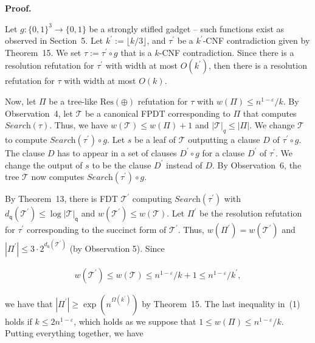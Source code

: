 \documentclass[10pt,a4paper]{article}
\begin{document}
\par\medskip\noindent\textbf{Proof.}\par




Let $g:\{0,1\}^{3}\to\{0,1\}$ be a strongly stifled gadget – such functions exist as observed in Section 5.
Let $k^{\prime}:=\lfloor k/3\rfloor$, and $\tau^{\prime}$ be a $k^{\prime}$-CNF contradiction given by Theorem 15.
We set $\tau:=\tau^{\prime}\circ g$ that is a $k$-CNF contradiction.
Since there is a resolution refutation for $\tau^{\prime}$ with width at most $O(k^{\prime})$, then there is a resolution refutation for $\tau$ with width at most $O(k)$.\par




Now, let $\Pi$ be a tree-like $\text{Res}(\oplus)$ refutation for $\tau$ with $w(\Pi)\leq n^{1-\varepsilon}/k$.
By Observation 4, let $\mathcal{T}$ be a canonical FPDT corresponding to $\Pi$ that computes $\textit{Search}(\tau)$.
Thus, we have $w(\mathcal{T})\leq w(\Pi)+1$ and $|\mathcal{T}|_{q}\leq|\Pi|$.
We change $\mathcal{T}$ to compute $\textit{Search}(\tau^{\prime})\circ g$.
Let $s$ be a leaf of $\mathcal{T}$ outputting a clause $D$ of $\tau^{\prime}\circ g$.
The clause $D$ has to appear in a set of clauses $D^{\prime}\circ g$ for a clause $D^{\prime}$ of $\tau^{\prime}$.
We change the output of $s$ to be the clause $D^{\prime}$ instead of $D$.
By Observation 6, the tree $\mathcal{T}$ now computes $\textit{Search}(\tau^{\prime})\circ g$.\par




By Theorem 13, there is FDT $\mathcal{T}^{\prime}$ computing $\textit{Search}(\tau^{\prime})$ with $d_{\mathsf{q}}(\mathcal{T}^{\prime})\leq\log|\mathcal{T}|_{\mathsf{q}}$ and $w(\mathcal{T}^{\prime})\leq w(\mathcal{T})$.
Let $\Pi^{\prime}$ be the resolution refutation for $\tau^{\prime}$ corresponding to the succinct form of $\mathcal{T}^{\prime}$.
Thus, $w(\Pi^{\prime})=w(\mathcal{T}^{\prime})$ and $|\Pi^{\prime}|\leq 3\cdot 2^{d_{\mathsf{q}}(\mathcal{T}^{\prime})}$ (by Observation 5).
Since\par


\[\begin{gathered}
w(\mathcal{T}^{\prime})\leq w(\mathcal{T})\leq n^{1-\varepsilon}/k+1\leq n^{1-%
\varepsilon}/k^{\prime},
\end{gathered}\]


we have that $|\Pi^{\prime}|\geq\exp(n^{\Omega(k^{\prime})})$ by Theorem 15.
The last inequality in (1) holds if $k\leq 2n^{1-\varepsilon}$, which holds as we suppose that $1\leq w(\Pi)\leq n^{1-\varepsilon}/k$.
Putting everything together, we have\par
\end{document}
